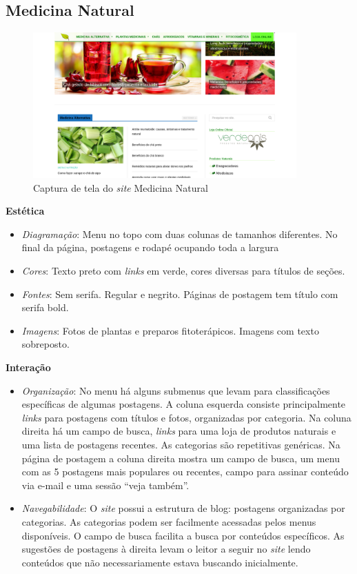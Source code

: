 \subsection{Medicina Natural}\label{medicina-natural}

\begin{figure}
\centering
\caption{\label{fig-medicinanatural}Captura de tela do \emph{site} Medicina Natural}
\includegraphics[width=0.9\textwidth]{images/similares/medicinanatural.png}
\end{figure}

\textbf{Estética}

\begin{itemize}
\item
  \emph{Diagramação}: Menu no topo com duas colunas de tamanhos diferentes. No final da página, postagens e rodapé ocupando toda a largura
\item
  \emph{Cores}: Texto preto com \emph{links} em verde, cores diversas para títulos de seções.
\item
  \emph{Fontes}: Sem serifa. Regular e negrito. Páginas de postagem tem título com serifa bold.
\item
  \emph{Imagens}: Fotos de plantas e preparos fitoterápicos. Imagens com texto sobreposto.
\end{itemize}

\textbf{Interação}

\begin{itemize}
\item
  \emph{Organização}: No menu há alguns submenus que levam para classificações específicas de algumas postagens. A coluna esquerda consiste principalmente \emph{links} para postagens com títulos e fotos, organizadas por categoria. Na coluna direita há um campo de busca, \emph{links} para uma loja de produtos naturais e uma lista de postagens recentes. As categorias são repetitivas genéricas.
  Na página de postagem a coluna direita mostra um campo de busca, um menu com as 5 postagens mais populares ou recentes, campo para assinar conteúdo via e-mail e uma sessão ``veja também''.
\item
  \emph{Navegabilidade}: O \emph{site} possui a estrutura de blog: postagens organizadas por categorias. As categorias podem ser facilmente acessadas pelos menus disponíveis. O campo de busca facilita a busca por conteúdos específicos. As sugestões de postagens à direita levam o leitor a seguir no \emph{site} lendo conteúdos que não necessariamente estava buscando inicialmente.
\end{itemize}

